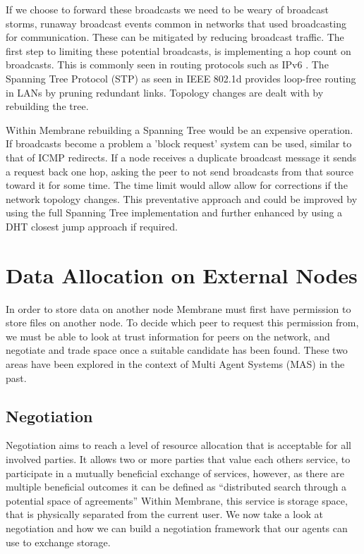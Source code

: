 \documentclass[11pt, a4paper, twocolumn, twoside]{report}
\begin{document}
If we choose to forward these broadcasts we need to be weary of broadcast storms, runaway broadcast events common in networks that used broadcasting for communication. \citep{Tseng:2002:BSP:506900.506905} These can be mitigated by reducing broadcast traffic. The first step to limiting these potential broadcasts, is implementing a hop count on broadcasts. This is commonly seen in routing protocols such as IPv6 \citep{deering1998internet}. The Spanning Tree Protocol (STP) as seen in IEEE 802.1d \citep*{ieee802ieee, sharma2004viking} provides loop-free routing in LANs by pruning redundant links. Topology changes are dealt with by rebuilding the tree.

Within Membrane rebuilding a Spanning Tree would be an expensive operation. If broadcasts become a problem a 'block request' system can be used, similar to that of ICMP redirects. \citep{postel1981rfc} If a node receives a duplicate broadcast message it sends a request back one hop, asking the peer to not send broadcasts from that source toward it for  some time. The time limit would allow allow for corrections if the network topology changes. This preventative approach and could be improved by using the full Spanning Tree implementation and further enhanced by using a DHT closest jump approach if required.

\section{Data Allocation on External Nodes}

In order to store data on another node Membrane must first have permission to store files on another node. To decide which peer to request this permission from, we must be able to look at trust information for peers on the network, and negotiate and trade space once a suitable candidate has been found. These two areas have been explored in the context of Multi Agent Systems (MAS) in the past. \citep{wooldridge2009introduction}

\subsection{Negotiation} \label{sec:neg}

Negotiation aims to reach a level of resource allocation that is acceptable for all involved parties. \citep{rahwan2005interest} It allows two or more parties that value each others service, to participate in a mutually beneficial exchange of services, however, as there are multiple beneficial outcomes it can be defined as ``distributed search through a potential space of agreements'' \citep{jennings2001automated} Within Membrane, this service is storage space, that is physically separated from the current user. We now take a look at negotiation and how we can build a negotiation framework that our agents can use to exchange storage.
\end{document}
